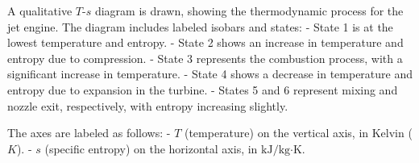 A qualitative \( T \)-\( s \) diagram is drawn, showing the thermodynamic process for the jet engine. The diagram includes labeled isobars and states:  
- State 1 is at the lowest temperature and entropy.  
- State 2 shows an increase in temperature and entropy due to compression.  
- State 3 represents the combustion process, with a significant increase in temperature.  
- State 4 shows a decrease in temperature and entropy due to expansion in the turbine.  
- States 5 and 6 represent mixing and nozzle exit, respectively, with entropy increasing slightly.  

The axes are labeled as follows:  
- \( T \) (temperature) on the vertical axis, in Kelvin (\( K \)).  
- \( s \) (specific entropy) on the horizontal axis, in \( \text{kJ}/\text{kg·K} \).